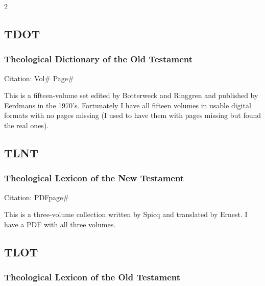 \begin{multicols}{2}
	\subsection*{TDOT}
	
		\subsubsection*{Theological Dictionary of the Old Testament}
		
			Citation:
				Vol\# Page\#
		
			This is a fifteen-volume set edited by Botterweck and Ringgren and published by Eerdmans in the 1970's. Fortunately I have all fifteen volumes in usable digital formats with no pages missing (I used to have them with pages missing but found the real ones).
			
	\subsection*{TLNT}
	
		\subsubsection*{Theological Lexicon of the New Testament}
		
			Citation:
				PDFpage\#
		
			This is a three-volume collection written by Spicq and translated by Ernest. I have a PDF with all three volumes. 
		
	\subsection*{TLOT}
	
		\subsubsection*{Theological Lexicon of the Old Testament}
		

\end{multicols}
